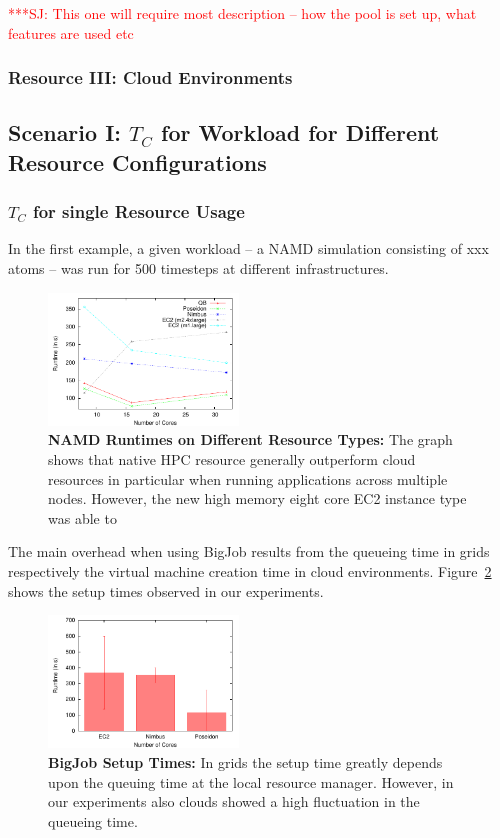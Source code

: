 \documentclass[conference,final]{IEEEtran}
\newcommand{\tc}{$T_{C}$ }
\newcommand{\jhanote}[1]{ {\textcolor{red} { ***SJ: #1 }}}
\newcommand{\jhanote}[1]{}
\begin{document}
\jhanote{This one will require most description -- how the pool is set
up, what features are used etc}

\subsubsection*{Resource III: Cloud Environments}


\subsection{Scenario I: \tc for Workload for Different Resource Configurations}

\subsubsection{\tc for single Resource Usage}

In the first example, a given workload -- a NAMD simulation consisting of xxx atoms --
was run for 500 timesteps at different infrastructures.

\begin{figure}[htbp]
    \centering
        \includegraphics[width=0.45\textwidth]{performance/namd_run.pdf}
    \caption{\textbf{NAMD Runtimes on Different Resource Types: } The graph shows that 
             native HPC resource generally outperform cloud resources in particular when
             running applications across multiple nodes. However, the new 
             high memory eight core EC2 instance type was able to }
    \label{fig:performance_namd_run}
\end{figure}

The main overhead when using BigJob results from the queueing time in grids respectively the virtual 
machine creation time in cloud environments. Figure~\ref{fig:performance_setup_time} shows the setup
times observed in our experiments. 
\begin{figure}[htbp]
    \centering
        \includegraphics[width=0.45\textwidth]{performance/setup_time.pdf}
    \caption{\textbf{BigJob Setup Times:} In grids the setup time greatly depends upon the 
    queuing time at the local resource manager. However, in our experiments also clouds showed
    a high fluctuation in the queueing time.}
    \label{fig:performance_setup_time}
\end{figure}
\end{document}
